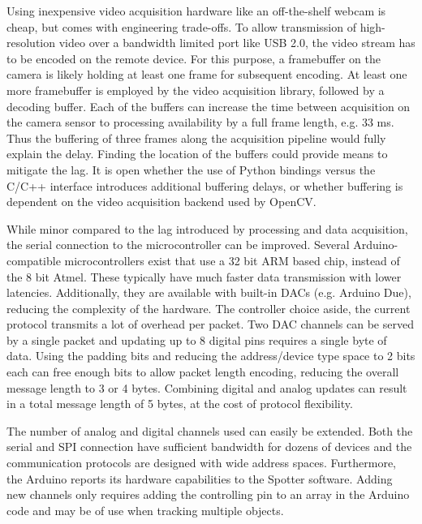 Using inexpensive video acquisition hardware like an off-the-shelf webcam is cheap, but comes with engineering trade-offs. To allow transmission of high-resolution video over a bandwidth limited port like USB 2.0, the video stream has to be encoded on the remote device. For this purpose, a framebuffer on the camera is likely holding at least one frame for subsequent encoding. At least one more framebuffer is employed by the video acquisition library, followed by a decoding buffer. Each of the buffers can increase the time between acquisition on the camera sensor to processing availability by a full frame length, e.g. 33 ms. Thus the buffering of three frames along the acquisition pipeline would fully explain the delay. Finding the location of the buffers could provide means to mitigate the lag. It is open whether the use of Python bindings versus the C/C++ interface introduces additional buffering delays, or whether buffering is dependent on the video acquisition backend used by OpenCV.  

While minor compared to the lag introduced by processing and data acquisition, the serial connection to the microcontroller can be improved. Several Arduino-compatible microcontrollers exist that use a 32 bit ARM based chip, instead of the 8 bit Atmel. These typically have much faster data transmission with lower latencies. Additionally, they are available with built-in DACs (e.g. Arduino Due), reducing the complexity of the hardware. The controller choice aside, the current protocol transmits a lot of overhead per packet. Two DAC channels can be served by a single packet and updating up to 8 digital pins requires a single byte of data. Using the padding bits and reducing the address/device type space to 2 bits each can free enough bits to allow packet length encoding, reducing the overall message length to 3 or 4 bytes. Combining digital and analog updates can result in a total message length of 5 bytes, at the cost of protocol flexibility.

The number of analog and digital channels used can easily be extended. Both the serial and SPI connection have sufficient bandwidth for dozens of devices and the communication protocols are designed with wide address spaces. Furthermore, the Arduino reports its hardware capabilities to the Spotter software. Adding new channels only requires adding the controlling pin to an array in the Arduino code and may be of use when tracking multiple objects.

